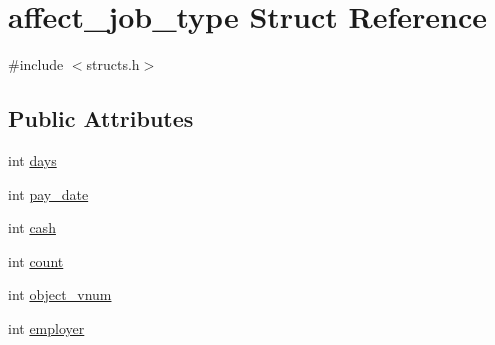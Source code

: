 \hypertarget{structaffect__job__type}{\section{affect\-\_\-job\-\_\-type Struct Reference}
\label{structaffect__job__type}
}


{\ttfamily \#include $<$structs.\-h$>$}

\subsection*{Public Attributes}
\begin{DoxyCompactItemize}
\item 
int \hyperlink{structaffect__job__type_a7f3bb0af069978da2803c73c37c429c2}{days}
\item 
int \hyperlink{structaffect__job__type_a209da486a69582e12db8acd4e0446f39}{pay\-\_\-date}
\item 
int \hyperlink{structaffect__job__type_ad5345379577918f150a0d67f01423703}{cash}
\item 
int \hyperlink{structaffect__job__type_ab2383ebbbb5807be4bfa65d62048b389}{count}
\item 
int \hyperlink{structaffect__job__type_ae82fa8285f26f550b485a6a19b9b9e13}{object\-\_\-vnum}
\item 
int \hyperlink{structaffect__job__type_a982d2988dc92492858f84184bbc3ce35}{employer}
\end{DoxyCompactItemize}



